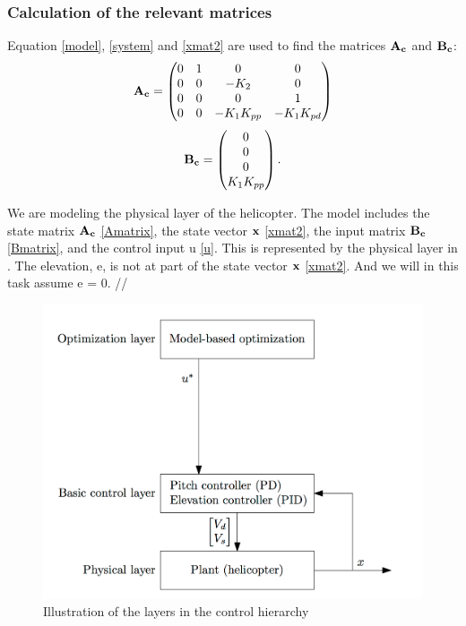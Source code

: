 \documentclass[12pt, a4paper]{article}%
\begin{document}
\subsubsection{Calculation of the relevant matrices}
Equation \eqref{model}, \eqref{system} and \eqref{xmat2} are used to find the matrices $\bold{A_c}$ and $\bold{B_c}$:
\begin{equation}
\bold{A_c} =
\begin{pmatrix}
0 & 1 & 0 & 0  \\
0 & 0 & -K_2 & 0 \\
0 & 0 & 0 & 1 \\
0 & 0 & -K_1K_{pp} & -K_1K_{pd}
\end{pmatrix} 
\label{Amatrix}
\end{equation}
\begin{equation}
\bold{B_c} =
\begin{pmatrix}
0\\
0 \\
0 \\
K_1K_{pp}
\end{pmatrix}.
\label{Bmatrix}
\end{equation}

We are modeling the physical layer of the helicopter. The model includes the state matrix $\bold{A_c}$ \eqref{Amatrix}, the state vector $\bold{x}$ \eqref{xmat2}, the input matrix $\bold{B_c}$ \eqref{Bmatrix}, and the control input u \eqref{u}. This is represented by the physical layer in . The elevation, e, is not at part of the state vector $\bold{x}$ \eqref{xmat2}. And we will in this task assume e = 0. //

\begin{figure}[h!]
\begin{center}
\centering
\includegraphics[scale=0.3]{Figur.png}
\caption{Illustration of the layers in the control hierarchy}
\label{fig:model2}
\end{center}
\end{figure}
\end{document}
